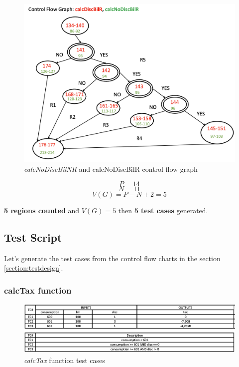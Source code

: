 \documentclass{article}
\begin{document}
    \begin{figure}[h!]
        \includegraphics[width=0.6\linewidth, center]{cfg/calcDiscBilR.png}
        \caption{\textit{calcNoDiscBilNR} and \textit{}{calcNoDiscBilR} control flow graph}
        \label{fig:cfgBilR}
    \end{figure}

    \begin{equation*}
        P = 14
    \end{equation*}
    \begin{equation*}
        N = 11
    \end{equation*}
    \begin{equation*}
        V(G) = P - N + 2 = 5
    \end{equation*}
    
    \textbf{5 regions counted} and $V(G) = 5$ then \textbf{5 test cases} generated.


    \newpage

    \subsection{Test Script}

    Let's generate the test cases from the control flow charts in the section \ref{section:testdesign}.
    
    \subsubsection{calcTax function}

    \begin{figure}[h!]
        \includegraphics[width=0.8\linewidth, center]{unit_tests/calcTax.png}
        \caption{\textit{calcTax} function test cases}
        \label{fig:calcTax}
    \end{figure}
    
\end{document}
